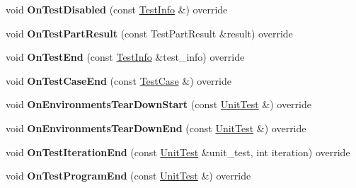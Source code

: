 \begin{DoxyCompactItemize}
void {\bfseries On\+Test\+Disabled} (const \mbox{\hyperlink{classtesting_1_1TestInfo}{Test\+Info}} \&) override
\item 
\mbox{\label{classtesting_1_1internal_1_1BriefUnitTestResultPrinter_aca32da1e631ce44e64804078844f94b8}} 
void {\bfseries On\+Test\+Part\+Result} (const Test\+Part\+Result \&result) override
\item 
\mbox{\label{classtesting_1_1internal_1_1BriefUnitTestResultPrinter_a75d77451c674519eed649c52f73c61c0}} 
void {\bfseries On\+Test\+End} (const \mbox{\hyperlink{classtesting_1_1TestInfo}{Test\+Info}} \&test\+\_\+info) override
\item 
\mbox{\label{classtesting_1_1internal_1_1BriefUnitTestResultPrinter_aaaa19bdfc9d9981e554cf40a4e4d6f42}} 
void {\bfseries On\+Test\+Case\+End} (const \mbox{\hyperlink{classtesting_1_1TestSuite}{Test\+Case}} \&) override
\item 
\mbox{\label{classtesting_1_1internal_1_1BriefUnitTestResultPrinter_a009cd64ff8c09e710f0ed30ac8a4dbd0}} 
void {\bfseries On\+Environments\+Tear\+Down\+Start} (const \mbox{\hyperlink{classtesting_1_1UnitTest}{Unit\+Test}} \&) override
\item 
\mbox{\label{classtesting_1_1internal_1_1BriefUnitTestResultPrinter_a2c962765dfaa484ab9dc21699ce636c9}} 
void {\bfseries On\+Environments\+Tear\+Down\+End} (const \mbox{\hyperlink{classtesting_1_1UnitTest}{Unit\+Test}} \&) override
\item 
\mbox{\label{classtesting_1_1internal_1_1BriefUnitTestResultPrinter_a8533d95c71833e1f8d0d63f519ec2e6f}} 
void {\bfseries On\+Test\+Iteration\+End} (const \mbox{\hyperlink{classtesting_1_1UnitTest}{Unit\+Test}} \&unit\+\_\+test, int iteration) override
\item 
\mbox{\label{classtesting_1_1internal_1_1BriefUnitTestResultPrinter_a7429a7423562e4dd6cabce8ea6c661c8}} 
void {\bfseries On\+Test\+Program\+End} (const \mbox{\hyperlink{classtesting_1_1UnitTest}{Unit\+Test}} \&) override
\end{DoxyCompactItemize}
